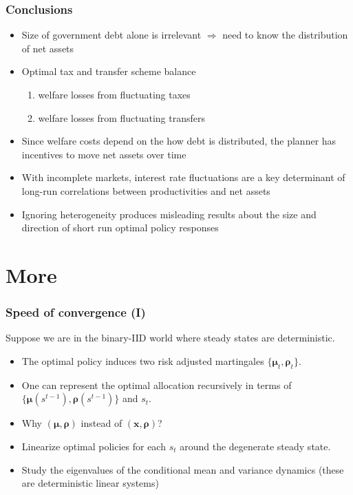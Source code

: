 \documentclass{beamer}
\begin{document}
\begin{frame}
 \frametitle{Conclusions}
\begin{itemize}
\item Size of government debt alone is irrelevant $\Longrightarrow $
need to know the  distribution of net assets
\item Optimal tax and transfer scheme balance
\begin{enumerate}
 \item welfare losses from fluctuating taxes
 \item welfare losses from fluctuating transfers
\end{enumerate}
\item Since welfare costs depend on the how debt is distributed, the planner has incentives to move  net assets over time
\item With incomplete markets, interest rate fluctuations are a  key determinant of  long-run correlations between productivities and net assets
\item Ignoring heterogeneity produces misleading results about the size and direction of short run optimal policy responses
\end{itemize}

\end{frame}
\appendix
\section{More}

\begin{frame}[label=convergence]
\frametitle{Speed of convergence  (I) }
Suppose we are in the binary-IID world where steady states are deterministic.


\begin{itemize}
\item The optimal policy induces two risk adjusted martingales $\{\bm{\mu}_{t},\bm{\rho}_{t}\}$.
 \item One can represent the optimal allocation recursively in terms of $\{\bm \mu(s^{t-1}),\bm \rho(s^{t-1})\}$ and $s_t$.
\item Why $(\bm{\mu},\bm{\rho})$ instead of $(\bm{x},\bm{\rho})$?
\item Linearize optimal policies for each $s_t$ around the degenerate steady state.
\item Study the eigenvalues of the conditional mean and variance dynamics (these are deterministic linear systems)
\end{itemize}

\end{frame}
\end{document}
